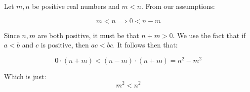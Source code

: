 \documentclass{article}
\begin{document}
Let $m,n$ be positive real numbers and $m < n$. From our assumptions:

\begin{equation*}
	m < n \implies 0 < n - m
\end{equation*}

Since $n,m$ are both positive, it must be that $n + m > 0$. We use the fact
that if $a<b$ and $c$ is positive, then $ac < bc$. It follows then
that:

\begin{equation*}
	0 \cdot (n+m) < (n-m) \cdot (n+m) = n^2 - m^2
\end{equation*}

Which is just:
\begin{equation*}
	m^2 < n^2
\end{equation*}
\end{document}
